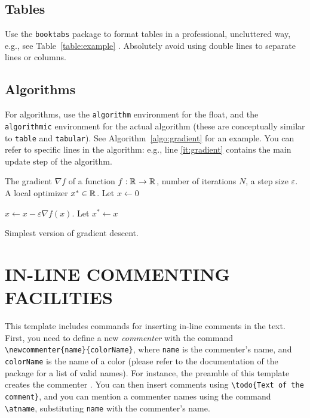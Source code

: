 \documentclass[letterpaper, 10 pt, conference]{ieeeconf}
\begin{document}
\subsection{Tables}
 Use the \texttt{booktabs} package to format tables in a professional, uncluttered way, e.g., see Table~\ref{table:example} . Absolutely avoid using double lines to separate lines or columns.

\subsection{Algorithms}
For algorithms, use the \verb|algorithm| environment for the float, and the \verb|algorithmic| environment for the actual algorithm (these are conceptually similar to \verb|table| and \verb|tabular|). See Algorithm~\ref{algo:gradient} for an example. You can refer to specific lines in the algorithm: e.g., line \ref{it:gradient} contains the main update step of the algorithm.

\begin{algorithm}
  \begin{algorithmic}[1]
    \Require The gradient $\nabla f$ of a function $f:\mathbb{R}^{}{}\to\mathbb{R}^{}{}$, number of iterations $N$, a step size $\varepsilon$.
    \Ensure A local optimizer $x^\ast\in\mathbb{R}^{}{}$.
    \State Let $x\gets 0$ 

    \State $x\gets x-\varepsilon\nabla f(x)$. \label{it:gradient}
    \EndFor
    \State Let $x^\ast\gets x$
    \label{it:endwhile}
  \end{algorithmic}
  \caption{Simplest version of gradient descent.}
  \label{algo:gradient}
\end{algorithm}

 \addtolength{\textheight}{-7.2cm}   %

\section{IN-LINE COMMENTING FACILITIES}
This template includes commands for inserting in-line comments in the text. First, you need to define a new \emph{commenter} with the command \verb|\newcommenter{name}{colorName}|, where \verb|name| is the commenter's name, and \verb|colorName| is the name of a color (please refer to the documentation of the  package for a list of valid names). For instance, the preamble of this template creates the commenter . You can then insert comments using \verb|\todo{Text of the comment}|, and you can mention a commenter names using the command \verb|\atname|, substituting \verb|name| with the commenter's name. 
\end{document}
